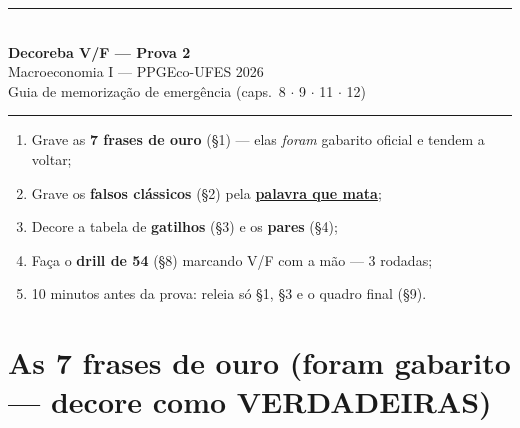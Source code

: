 \documentclass[12pt, a4paper]{article}
\newcommand{\mata}[1]{\textcolor{redf}{\underline{\textbf{#1}}}}
\begin{document}

\begin{center}
\vspace*{0.2cm}
\rule{\linewidth}{1.2pt}\\[0.6em]
{\LARGE\bfseries\color{cyanrbc} Decoreba V/F --- Prova 2}\\[0.3em]
{\large Macroeconomia I --- PPGEco-UFES 2026}\\[0.3em]
{\normalsize\color{grayrbc} Guia de memorização de emergência
(caps.\ 8 $\cdot$ 9 $\cdot$ 11 $\cdot$ 12)}\\[0.5em]
\rule{\linewidth}{1.2pt}
\end{center}

\begin{provabox}[title={Modo de usar (sem tempo para teoria)}]
\begin{enumerate}[leftmargin=1.6em, itemsep=0.1em, topsep=0.2em]
\item Grave as \textbf{7 frases de ouro} (§1) --- elas \emph{foram} gabarito
oficial e tendem a voltar;
\item Grave os \textbf{falsos clássicos} (§2) pela \mata{palavra que mata};
\item Decore a tabela de \textbf{gatilhos} (§3) e os \textbf{pares} (§4);
\item Faça o \textbf{drill de 54} (§8) marcando V/F com a mão --- 3 rodadas;
\item 10 minutos antes da prova: releia só §1, §3 e o quadro final (§9).
\end{enumerate}
\end{provabox}

\section{As 7 frases de ouro (foram gabarito --- decore como VERDADEIRAS)}
\end{document}
